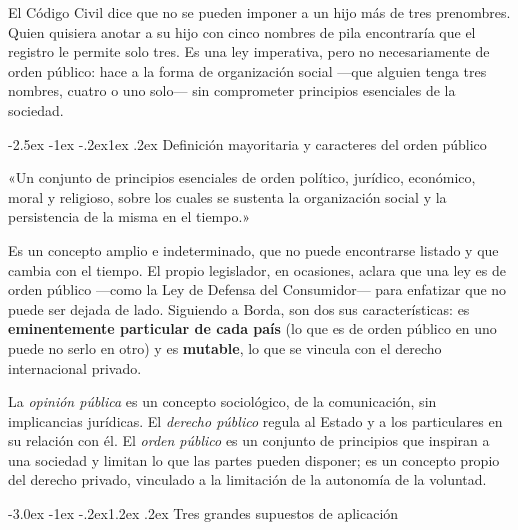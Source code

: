 \documentclass[12pt,oneside]{book}
\makeatletter
\renewcommand\section{\@startsection{section}{1}{\z@}%
  {-3.0ex \@plus -1ex \@minus -.2ex}{1.2ex \@plus .2ex}%
  {\normalfont\large\bfseries\color{acento}}}
\renewcommand\subsection{\@startsection{subsection}{2}{\z@}%
  {-2.5ex \@plus -1ex \@minus -.2ex}{1ex \@plus .2ex}%
  {\normalfont\normalsize\bfseries}}
\makeatother
\begin{document}
\begin{ejemplo}
El Código Civil dice que no se pueden imponer a un hijo más de tres prenombres. Quien quisiera anotar a su hijo con cinco nombres de pila encontraría que el registro le permite solo tres. Es una ley imperativa, pero no necesariamente de orden público: hace a la forma de organización social ---que alguien tenga tres nombres, cuatro o uno solo--- sin comprometer principios esenciales de la sociedad.
\end{ejemplo}

\subsection{Definición mayoritaria y caracteres del orden público}

\begin{definicion}
«Un conjunto de principios esenciales de orden político, jurídico, económico, moral y religioso, sobre los cuales se sustenta la organización social y la persistencia de la misma en el tiempo.»
\end{definicion}

Es un concepto amplio e indeterminado, que no puede encontrarse listado y que cambia con el tiempo. El propio legislador, en ocasiones, aclara que una ley es de orden público ---como la Ley de Defensa del Consumidor--- para enfatizar que no puede ser dejada de lado. Siguiendo a Borda, son dos sus características: es \textbf{eminentemente particular de cada país} (lo que es de orden público en uno puede no serlo en otro) y es \textbf{mutable}, lo que se vincula con el derecho internacional privado.

\begin{nota}
La \textit{opinión pública} es un concepto sociológico, de la comunicación, sin implicancias jurídicas. El \textit{derecho público} regula al Estado y a los particulares en su relación con él. El \textit{orden público} es un conjunto de principios que inspiran a una sociedad y limitan lo que las partes pueden disponer; es un concepto propio del derecho privado, vinculado a la limitación de la autonomía de la voluntad.
\end{nota}

\section{Tres grandes supuestos de aplicación}
\end{document}
